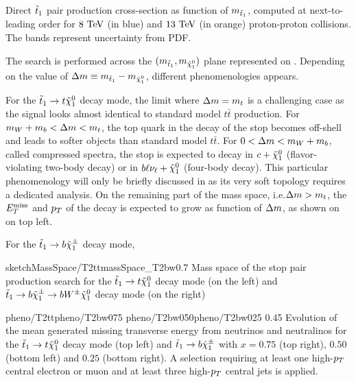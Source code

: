         {Direct $\tilde{t}_1$ pair production cross-section as function of $m_{\tilde{t}_1}$, computed at next-to-leading order
        for $8~\text{TeV}$ (in blue) and $13~\text{TeV}$ (in orange) proton-proton collisions. The bands represent uncertainty from PDF.}

        The search is performed across the $(m_{\tilde{t}_1},m_{\tilde{\chi}_1^0})$ plane
        represented on . Depending on the value of
        $\Delta m \equiv m_{\tilde{t}_1} - m_{\tilde{\chi}_1^0}$, different phenomenologies
        appears.

        For the $\tilde{t}_1 \rightarrow t \tilde{\chi}_1^0$ decay mode, the limit where
        $\Delta m = m_{t}$ is a challenging case as the signal looks almost identical
        to standard model $t\bar{t}$ production. For $m_{W} + m_{b} < \Delta m < m_{t}$,
        the top quark in the decay of the stop becomes off-shell and leads to softer objects
        than standard model $t\bar{t}$. For $0 < \Delta m < m_{W} + m_{b}$, called
        compressed spectra, the stop is expected to decay in $c+\tilde{\chi}_1^0$
        (flavor-violating two-body decay) or in $b\ell\nu_\ell+\tilde{\chi}_1^0$ (four-body
        decay). This particular phenomenology will only be briefly discussed in
         as its very soft topology requires a
        dedicated analysis. On the remaining part of the mass space, i.e.$\Delta m > m_{t}$,
        the $E_T^\text{miss}$ and $p_T$ of the decay is expected to grow as function of $\Delta m$,
        as shown on  on top left.

        For the $\tilde{t}_1 \rightarrow b \tilde{\chi}_1^\pm$ decay mode, 

                     {sketchMassSpace/T2tt}{massSpace_T2bw}{0.7}
                     {Mass space of the stop pair production search for the $\tilde{t}_1
                     \rightarrow t \tilde{\chi}_1^0$ decay mode (on the left) and $\tilde{t}_1
                     \rightarrow b \tilde{\chi}_1^\pm \rightarrow b W^{\pm} \tilde{\chi}_1^0 $ decay
                     mode (on the right) }

                     {pheno/T2tt}{pheno/T2bw075}
                     {pheno/T2bw050}{pheno/T2bw025}
                     {0.45}
                     {Evolution of the mean generated missing transverse energy from neutrinos
                     and neutralinos for the $\tilde{t}_1 \rightarrow t \tilde{\chi}_1^0$
                     decay mode (top left) and $\tilde{t}_1 \rightarrow b \tilde{\chi}_1^\pm$ with
                     $x = 0.75$ (top right), $0.50$ (bottom left) and $0.25$ (bottom right).
                     A selection requiring at least one high-$p_T$ central
                     electron or muon and at least three high-$p_T$ central jets is applied.}

